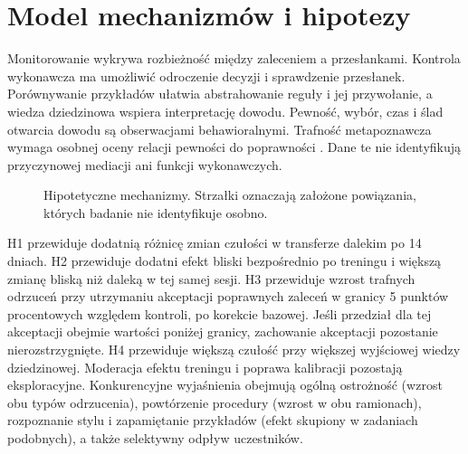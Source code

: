 \documentclass[11pt,a4paper]{article}
\begin{document}
\section{Model mechanizmów i hipotezy}
Monitorowanie wykrywa rozbieżność między zaleceniem a przesłankami. Kontrola wykonawcza ma umożliwić odroczenie decyzji i sprawdzenie przesłanek. Porównywanie przykładów ułatwia abstrahowanie reguły i jej przywołanie, a wiedza dziedzinowa wspiera interpretację dowodu. Pewność, wybór, czas i ślad otwarcia dowodu są obserwacjami behawioralnymi. Trafność metapoznawcza wymaga osobnej oceny relacji pewności do poprawności \citep{fleming2014}. Dane te nie identyfikują przyczynowej mediacji ani funkcji wykonawczych.

\begin{figure}[ht]
\centering
{}
\caption{Hipotetyczne mechanizmy. Strzałki oznaczają założone powiązania, których badanie nie identyfikuje osobno.}
\end{figure}

H1 przewiduje dodatnią różnicę zmian czułości w transferze dalekim po 14 dniach. H2 przewiduje dodatni efekt bliski bezpośrednio po treningu i większą zmianę bliską niż daleką w tej samej sesji. H3 przewiduje wzrost trafnych odrzuceń przy utrzymaniu akceptacji poprawnych zaleceń w granicy 5 punktów procentowych względem kontroli, po korekcie bazowej. Jeśli przedział dla tej akceptacji obejmie wartości poniżej granicy, zachowanie akceptacji pozostanie nierozstrzygnięte. H4 przewiduje większą czułość przy większej wyjściowej wiedzy dziedzinowej. Moderacja efektu treningu i poprawa kalibracji pozostają eksploracyjne. Konkurencyjne wyjaśnienia obejmują ogólną ostrożność (wzrost obu typów odrzucenia), powtórzenie procedury (wzrost w obu ramionach), rozpoznanie stylu i zapamiętanie przykładów (efekt skupiony w zadaniach podobnych), a także selektywny odpływ uczestników.
\end{document}
